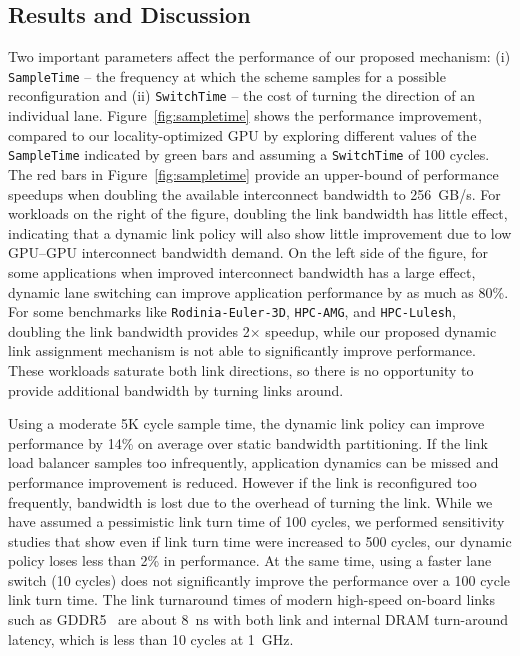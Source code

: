\subsection{Results and Discussion} 

Two important parameters affect the performance of
our proposed mechanism: (i)
\texttt{SampleTime} -- the frequency at which the scheme samples for a possible
reconfiguration and (ii) \texttt{SwitchTime} -- the cost of turning the
direction of an individual lane. Figure~\ref{fig:sampletime} shows the 
performance improvement, compared to our locality-optimized GPU by exploring different values of the
\texttt{SampleTime} indicated by green bars and assuming a \texttt{SwitchTime}
of 100 cycles. The red bars in Figure~\ref{fig:sampletime} provide an
upper-bound of performance speedups when doubling the available interconnect
bandwidth to \SI{256}{GB/s}. For workloads on the right of the figure, doubling the link
bandwidth has little effect, indicating that a dynamic link policy will also show little
improvement due to low GPU--GPU interconnect bandwidth demand.
On the left side of the figure, for some
applications when improved interconnect bandwidth has a large effect,
dynamic lane switching can improve application performance by as much as 80\%.
For some benchmarks like \texttt{Rodinia-Euler-3D}, \texttt{HPC-AMG}, and 
\texttt{HPC-Lulesh}, doubling the link bandwidth provides 2$\times$ 
speedup, while our proposed dynamic link assignment mechanism is not 
able to significantly improve performance. These workloads 
saturate both link directions, so there is no opportunity to 
provide additional bandwidth by turning links around.

Using a moderate 5K cycle sample time, the dynamic link policy can improve performance
by 14\% on average over static bandwidth partitioning. If the link load
balancer samples too infrequently, application dynamics can be missed
and performance improvement is reduced. However if the link is reconfigured
too frequently, bandwidth is lost due to the overhead of turning the link.
While we have assumed a pessimistic link turn time of 100 cycles, we performed
sensitivity studies that show even if link turn time were increased to 500
cycles, our dynamic policy loses less than 2\% in performance. 
At the same time, using a faster lane switch (10 cycles) does not
significantly improve the performance over a 100 cycle link turn time.
The link
turnaround times of modern high-speed on-board links such as
GDDR5~\cite{hynixgddr51Gb} are about \SI{8}{ns} with both link and internal 
DRAM turn-around latency, which is less than 10 cycles at \SI{1}{GHz}.

